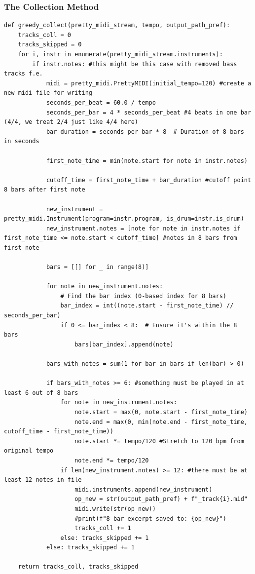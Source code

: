 \documentclass[a4paper,12pt]{extarticle}
\begin{document}
\subsubsection{The Collection Method}
\begin{lstlisting}
def greedy_collect(pretty_midi_stream, tempo, output_path_pref):
    tracks_coll = 0
    tracks_skipped = 0
    for i, instr in enumerate(pretty_midi_stream.instruments):
        if instr.notes: #this might be this case with removed bass tracks f.e.
            midi = pretty_midi.PrettyMIDI(initial_tempo=120) #create a new midi file for writing
            seconds_per_beat = 60.0 / tempo
            seconds_per_bar = 4 * seconds_per_beat #4 beats in one bar (4/4, we treat 2/4 just like 4/4 here)
            bar_duration = seconds_per_bar * 8  # Duration of 8 bars in seconds

            first_note_time = min(note.start for note in instr.notes) 

            cutoff_time = first_note_time + bar_duration #cutoff point 8 bars after first note

            new_instrument = pretty_midi.Instrument(program=instr.program, is_drum=instr.is_drum)
            new_instrument.notes = [note for note in instr.notes if first_note_time <= note.start < cutoff_time] #notes in 8 bars from first note

            bars = [[] for _ in range(8)]

            for note in new_instrument.notes:
                # Find the bar index (0-based index for 8 bars)
                bar_index = int((note.start - first_note_time) // seconds_per_bar)
                if 0 <= bar_index < 8:  # Ensure it's within the 8 bars
                    bars[bar_index].append(note)

            bars_with_notes = sum(1 for bar in bars if len(bar) > 0)

            if bars_with_notes >= 6: #something must be played in at least 6 out of 8 bars
                for note in new_instrument.notes:
                    note.start = max(0, note.start - first_note_time)
                    note.end = max(0, min(note.end - first_note_time, cutoff_time - first_note_time))
                    note.start *= tempo/120 #Stretch to 120 bpm from original tempo
                    note.end *= tempo/120
                if len(new_instrument.notes) >= 12: #there must be at least 12 notes in file
                    midi.instruments.append(new_instrument)
                    op_new = str(output_path_pref) + f"_track{i}.mid"
                    midi.write(str(op_new))
                    #print(f"8 bar excerpt saved to: {op_new}")
                    tracks_coll += 1
                else: tracks_skipped += 1
            else: tracks_skipped += 1

    return tracks_coll, tracks_skipped
\end{lstlisting}
\end{document}
